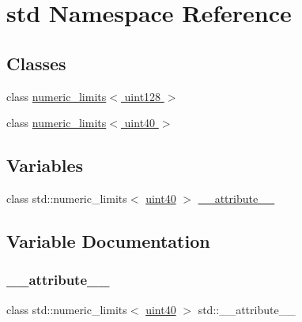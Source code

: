 \hypertarget{namespacestd}{}\section{std Namespace Reference}
\label{namespacestd}
\subsection*{Classes}
\begin{DoxyCompactItemize}
\item 
class \hyperlink{classstd_1_1numeric__limits_3_01uint128_01_4}{numeric\+\_\+limits$<$ uint128 $>$}
\item 
class \hyperlink{classstd_1_1numeric__limits_3_01uint40_01_4}{numeric\+\_\+limits$<$ uint40 $>$}
\end{DoxyCompactItemize}
\subsection*{Variables}
\begin{DoxyCompactItemize}
\item 
class std\+::numeric\+\_\+limits$<$ \hyperlink{classuint40}{uint40} $>$ \hyperlink{namespacestd_ade73df0294cb697bb61d5edf0deac7d0}{\+\_\+\+\_\+attribute\+\_\+\+\_\+}
\end{DoxyCompactItemize}


\subsection{Variable Documentation}
\mbox{\label{namespacestd_ade73df0294cb697bb61d5edf0deac7d0}} 
\subsubsection{\texorpdfstring{\+\_\+\+\_\+attribute\+\_\+\+\_\+}{\_\_attribute\_\_}}
{\footnotesize\ttfamily class std\+::numeric\+\_\+limits$<$ \hyperlink{classuint40}{uint40} $>$ std\+::\+\_\+\+\_\+attribute\+\_\+\+\_\+}

